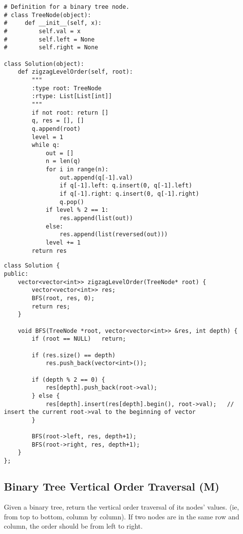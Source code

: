 \begin{lstlisting}
# Definition for a binary tree node.
# class TreeNode(object):
#     def __init__(self, x):
#         self.val = x
#         self.left = None
#         self.right = None

class Solution(object):
    def zigzagLevelOrder(self, root):
        """
        :type root: TreeNode
        :rtype: List[List[int]]
        """
        if not root: return []
        q, res = [], []
        q.append(root)
        level = 1
        while q:
            out = []
            n = len(q)
            for i in range(n):
                out.append(q[-1].val)
                if q[-1].left: q.insert(0, q[-1].left)
                if q[-1].right: q.insert(0, q[-1].right)
                q.pop()
            if level % 2 == 1:
                res.append(list(out))
            else:
                res.append(list(reversed(out)))
            level += 1
        return res
\end{lstlisting}

\begin{lstlisting}
class Solution {
public:
    vector<vector<int>> zigzagLevelOrder(TreeNode* root) {
        vector<vector<int>> res;
        BFS(root, res, 0);
        return res;
    }
    
    void BFS(TreeNode *root, vector<vector<int>> &res, int depth) {
        if (root == NULL)   return;
        
        if (res.size() == depth)
            res.push_back(vector<int>());  

        if (depth % 2 == 0) {                                   
            res[depth].push_back(root->val);
        } else {                                                
            res[depth].insert(res[depth].begin(), root->val);   // insert the current root->val to the beginning of vector
        }
        
        BFS(root->left, res, depth+1);  
        BFS(root->right, res, depth+1);
    }
};
\end{lstlisting}


\subsection{Binary Tree Vertical Order Traversal (M)}
Given a binary tree, return the vertical order traversal of its nodes' values. (ie, from top to bottom, column by column). If two nodes are in the same row and column, the order should be from left to right.\\

